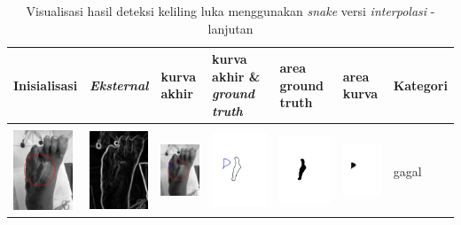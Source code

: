 \begin{table}[H]
	\centering
	\caption{Visualisasi hasil deteksi keliling luka menggunakan \emph{snake} versi \emph{interpolasi} - lanjutan}
	\label{tabel_hasil_11_interp}
	\begin{tabular}{|m{0.7in}|m{0.7in}|m{0.7in}|m{0.7in}|m{0.7in}|m{0.7in}|m{0.7in}|}
		\hline
		\textbf{Inisialisasi} & \textbf{\emph{Eksternal}} & \textbf{kurva akhir} & \textbf{kurva akhir \& \emph{ground truth}}& \textbf{area ground truth} & \textbf{area kurva} & \textbf{Kategori} \\
		\hline
		
		&  &  & & & &  \\
		\includegraphics[width=0.7in]{dataset/dataset_3/luka_merah/ready/3_interp_init.jpg}&
		\includegraphics[width=0.7in]{dataset/dataset_3/luka_merah/ready/3_interp_ext.jpg}&
		\includegraphics[width=0.7in]{dataset/dataset_3/luka_merah/ready/3_interp_result.jpg}&
		\includegraphics[width=0.7in]{dataset/dataset_3/luka_merah/ready/3_gt_r.jpg}&
		\includegraphics[width=0.7in]{dataset/dataset_3/luka_merah/ready/3_r.jpg}&
		\includegraphics[width=0.7in]{dataset/dataset_3/luka_merah/ready/3_interp_r.jpg}&
		gagal\\
		\hline
		

\end{tabular}
\end{table}

